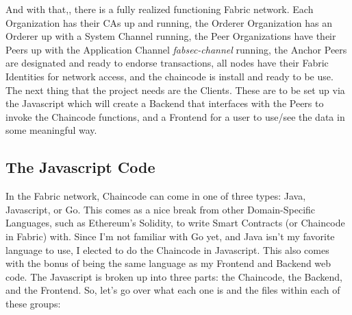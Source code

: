 		\hspace{10mm}And with that,, there is a fully realized functioning Fabric network. Each Organization has their CAs up and running, the Orderer Organization has an Orderer up with a System Channel running, the Peer Organizations have their Peers up with the Application Channel \textit{fabsec-channel} running, the Anchor Peers are designated and ready to endorse transactions, all nodes have their Fabric Identities for network access, and the chaincode is install and ready to be use. The next thing that the project needs are the Clients. These are to be set up via the Javascript which will create a Backend that interfaces with the Peers to invoke the Chaincode functions, and a Frontend for a user to use/see the data in some meaningful way.
					
	\subsection{The Javascript Code}
		\hspace{10mm} In the Fabric network, Chaincode can come in one of three types: Java, Javascript, or Go. This comes as a nice break from other Domain-Specific Languages, such as Ethereum's Solidity, to write Smart Contracts (or Chaincode in Fabric) with. Since I'm not familiar with Go yet, and Java isn't my favorite language to use, I elected to do the Chaincode in Javascript. This also comes with the bonus of being the same language as my Frontend and Backend web code. The Javascript is broken up into three parts: the Chaincode, the Backend, and the Frontend. So, let's go over what each one is and the files within each of these groups:
		
